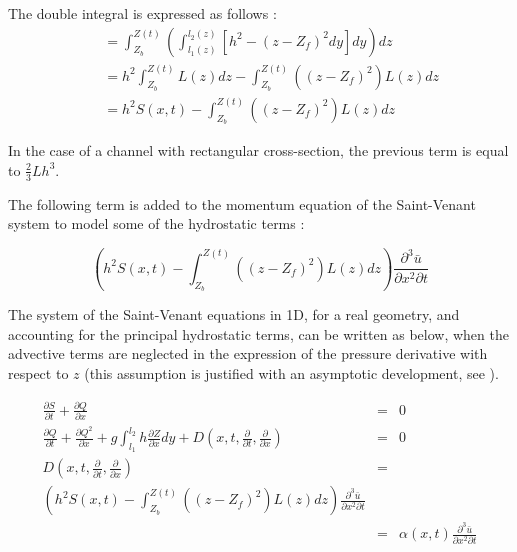 \vspace{0.5cm}

The double integral is expressed as follows : 
\begin{eqnarray}
&&=\int_{Z_{b}}^{Z(t)}\left(\int_{l_{1}(z)}^{l_{2}(z)}\left[h^2-(z-Z_f)^2dy\right]dy\right)dz\\
&&=h^2\int_{Z_{b}}^{Z(t)}L(z)dz-\int_{Z_{b}}^{Z(t)}\left((z-Z_f)^2\right)L(z)dz\\
&&=h^2S(x,t)-\int_{Z_{b}}^{Z(t)}\left((z-Z_f)^2\right)L(z)dz
\end{eqnarray}

\vspace{0.5cm}

In the case of a channel with rectangular cross-section, the previous term is equal to $\frac{2}{3}Lh^3$.

\vspace{0.5cm}

The following term is added to the momentum equation of the Saint-Venant system to model some of the hydrostatic terms :

\begin{equation}
  \left(h^2S(x,t)-\int_{Z_{b}}^{Z(t)}\left((z-Z_f)^2\right)L(z)dz\right)\frac{\partial^3{\bar{u}}}{\partial{{x}^2}\partial{t}}
\end{equation} 

\vspace{0.5cm}

The system of the Saint-Venant equations in 1D, for a real geometry, and accounting for the principal hydrostatic terms, can be written as below, when the advective terms are neglected in the expression of the pressure derivative with respect to $z$ (this assumption is justified with an asymptotic development, see \cite{BRISTEAU11}).

\begin{eqnarray}
\frac{\partial{S}}{\partial{t}}+\frac{\partial{Q}}{\partial{x}} & = & 0 \\
\frac{\partial{Q}}{\partial{t}}+\frac{\partial{Q^{2}}}{\partial{x}}+g\int_{l_{1}}^{l_{2}}h\frac{\partial{Z}}{\partial{x}}dy+D(x,t,\frac{\partial}{\partial{t}},\frac{\partial}{\partial{x}}) & = & 0 \\
D(x,t,\frac{\partial}{\partial{t}},\frac{\partial}{\partial{x}}) & = & \nonumber \\
\left(h^2S(x,t)-\int_{Z_{b}}^{Z(t)}\left((z-Z_f)^2\right)L(z)dz\right)\frac{\partial^3{\bar{u}}}{\partial{{x}^2}\partial{t}} & & \nonumber \\
& = & \alpha(x,t)\frac{\partial^3{\bar{u}}}{\partial{{x}^2}\partial{t}}
\label{eq:1}
\end{eqnarray}


